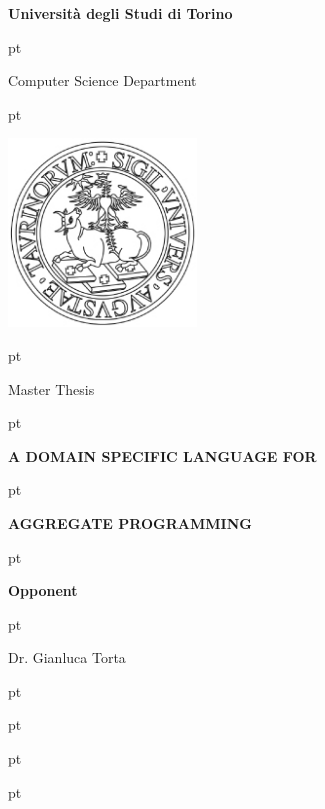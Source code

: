 
\thispagestyle{empty}


\centerline {\LARGE{\textbf{Universit\`a degli Studi di Torino}}}

 pt

\centerline {\Large{Computer Science Department}}

 pt

\centerline {\includegraphics[width=5cm]{imgs/logo_ateneo.jpg}}

 pt

\centerline {\Large {Master Thesis}}

 pt

\centerline {\Large {\bf A DOMAIN SPECIFIC LANGUAGE FOR}}
 pt
\centerline {\Large {\bf AGGREGATE PROGRAMMING}}

 pt

 \hspace{13.7cm} \textbf{Opponent}

 pt

\hspace{.7cm}{Prof. Ferruccio Damiani} \hspace{10.5cm} {Dr. Gianluca Torta}

 pt


 pt

\hspace{.7cm}{Dr. Giorgio Audrito}

 pt

\hspace{.7cm}{Dr. Danilo Pianini}

 pt

